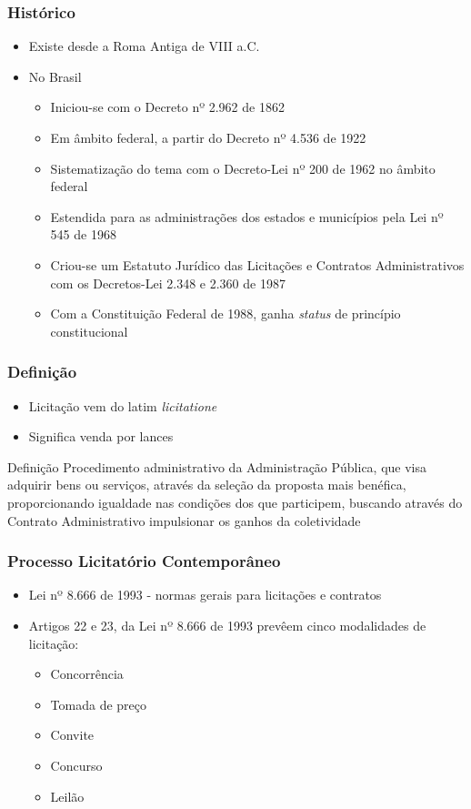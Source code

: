 \documentclass{beamer}
\begin{document}
		\begin{frame}\frametitle{Histórico}
			\begin{itemize}
				\item Existe desde a Roma Antiga de VIII a.C.
				\item No Brasil
				\begin{itemize}
					\item Iniciou-se com o Decreto nº 2.962 de 1862
					\item Em âmbito federal, a partir do Decreto nº 4.536 de 1922
					\item Sistematização do tema com o Decreto-Lei nº 200 de 1962 no âmbito federal
					\item Estendida para as administrações dos estados e municípios pela Lei nº 545 de 1968
					\item Criou-se um Estatuto Jurídico das Licitações e Contratos Administrativos com os Decretos-Lei 2.348 e 2.360 de 1987
					\item Com a Constituição Federal de 1988, ganha \textit{status} de princípio constitucional
				\end{itemize}	
			\end{itemize}
		\end{frame}
	
		\begin{frame} \frametitle{Definição}
			\begin{itemize}
				\item Licitação vem do latim \textit{licitatione} 
				\item Significa venda por lances
				
			\end{itemize}
		\begin{block}{Definição}
			Procedimento administrativo da Administração Pública, que visa adquirir bens ou serviços,
			através da seleção da proposta mais benéfica, proporcionando igualdade nas condições dos que participem, buscando através do Contrato Administrativo
			impulsionar os ganhos da coletividade
		\end{block}
		\end{frame}	
	
		\begin{frame} \frametitle{Processo Licitatório Contemporâneo}
			\begin{itemize}
				\item Lei nº 8.666 de 1993 - normas gerais para licitações e contratos
				\item Artigos 22 e 23, da Lei nº 8.666 de 1993 prevêem cinco modalidades de licitação:
					\begin{itemize}
						\item Concorrência
						\item Tomada de preço
						\item Convite
						\item Concurso
						\item Leilão
					\end{itemize}
			\end{itemize}
		\end{frame}		
	
\end{document}
